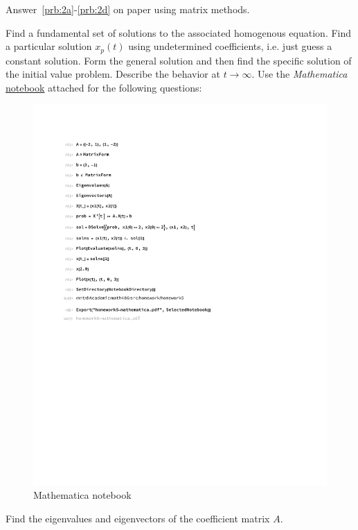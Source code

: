 \documentclass[
	number={5},
]{math486homework}
\begin{document}
\begin{problems}
	Answer~\ref{prb:2a}-\ref{prb:2d} on paper using matrix methods.
	\begin{problems}
		\subproblem Find a fundamental set of solutions to the associated homogenous equation. 
		\subproblem Find a particular solution $x_{p}(t)$ using undetermined coefficients, i.e. just guess a constant solution. 
		\subproblem Form the general solution and then find the specific solution of the initial value problem. 
		\subproblem Describe the behavior at $t\rightarrow\infty$. 
		\subproblem Use the \textit{Mathematica} \hyperref[fig:mathematica]{notebook} attached for the following questions:
		\begin{figure}[H]
			\centering
			\includegraphics[width=\textwidth]{homework5/homework5-mathematica}
			\caption{Mathematica notebook}
			\label{fig:mathematica}
		\end{figure}
		\begin{problems}
			\subsubproblem Find the eigenvalues and eigenvectors of the coefficient matrix $A$.

\end{problems}
\end{problems}
\end{problems}
\end{document}
